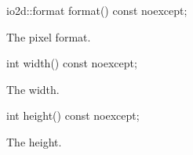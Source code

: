 %
\begin{itemdecl}
io2d::format format() const noexcept;
\end{itemdecl}
\begin{itemdescr}
\pnum
\returns
The pixel format.
\end{itemdescr}

%
\begin{itemdecl}
int width() const noexcept;
\end{itemdecl}
\begin{itemdescr}
\pnum
\returns
The width.
\end{itemdescr}

%
\begin{itemdecl}
int height() const noexcept;
\end{itemdecl}
\begin{itemdescr}
\pnum
\returns
The height.
\end{itemdescr}
